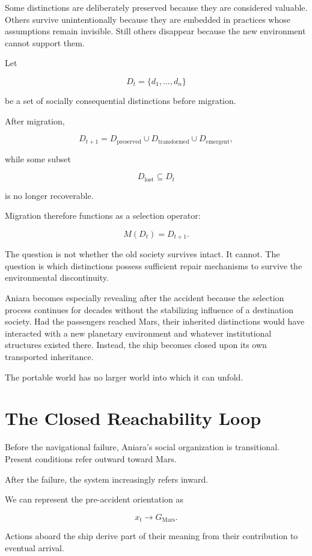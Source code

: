 \documentclass[11pt,oneside]{book}
\theoremstyle{definition}
\theoremstyle{remark}
\begin{document}
Some distinctions are deliberately preserved because they are considered valuable. Others survive unintentionally because they are embedded in practices whose assumptions remain invisible. Still others disappear because the new environment cannot support them.

Let

\[
D_t=\{d_1,\ldots,d_n\}
\]

be a set of socially consequential distinctions before migration.

After migration,

\[
D_{t+1}
=
D_{\mathrm{preserved}}
\cup
D_{\mathrm{transformed}}
\cup
D_{\mathrm{emergent}},
\]

while some subset

\[
D_{\mathrm{lost}}
\subseteq D_t
\]

is no longer recoverable.

Migration therefore functions as a selection operator:

\[
M(D_t)
=
D_{t+1}.
\]

The question is not whether the old society survives intact. It cannot. The question is which distinctions possess sufficient repair mechanisms to survive the environmental discontinuity.

Aniara becomes especially revealing after the accident because the selection process continues for decades without the stabilizing influence of a destination society. Had the passengers reached Mars, their inherited distinctions would have interacted with a new planetary environment and whatever institutional structures existed there. Instead, the ship becomes closed upon its own transported inheritance.

The portable world has no larger world into which it can unfold.

\section{The Closed Reachability Loop}

Before the navigational failure, Aniara's social organization is transitional. Present conditions refer outward toward Mars.

After the failure, the system increasingly refers inward.

We can represent the pre-accident orientation as

\[
x_t
\rightarrow
G_{\mathrm{Mars}}.
\]

Actions aboard the ship derive part of their meaning from their contribution to eventual arrival.
\end{document}
